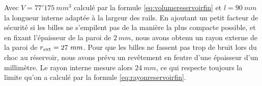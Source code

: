 Avec \(V=77'175\ mm^3\) calculé par la formule \ref{eq:volumereservoirfin} et \(l=90\ mm\) la longueur interne adaptée à la largeur des rails. En ajoutant un petit facteur de sécurité si les billes ne s'empilent pas de la manière la plus compacte possible, et en fixant l'épaisseur de la paroi de \(2\ mm \), nous avons obtenu un rayon externe de la paroi de \(r\textsubscript{ext}=27\ mm\). Pour que les billes ne fassent pas trop de bruit lors du choc au réservoir, nous avons prévu un revêtement en feutre d'une épaisseur d'un millimètre. Le rayon interne mesure alors \(24\ mm \), ce qui respecte toujours la limite qu'on a calculé par la formule \ref{eq:rayonreservoirfin}.
